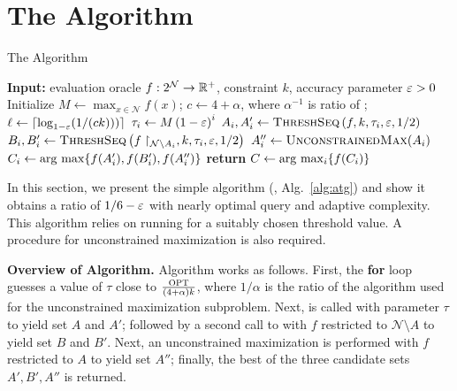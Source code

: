 \section{The \algOnefullname Algorithm} \label{sec:atg}
\begin{algorithm}[t]
    \caption{The \adapst Algorithm}
    \label{alg:atg}
    \begin{algorithmic}[1]
      \State \textbf{Input:} evaluation oracle $f:2^{\mathcal N} \to \mathbb{R}^+$, constraint $k$,
      accuracy parameter $\varepsilon > 0$
      \State Initialize $M \gets \max_{x \in \mathcal N} f(x)$; 
      $c \gets 4 + \alpha$, where $\alpha^{-1}$ is ratio of \unc;
      $\ell \gets \lceil\log_{1 - \varepsilon}(1/(ck)))\rceil$
      \label{line:forconcurrent}
      \State $\tau_i \gets M \left( 1 - \varepsilon \right)^i$
      \State $A_i,A_i' \gets \textsc{ThreshSeq} \left( f, k, \tau_i, \varepsilon, 1 / 2 \right) $
      \State $B_i,B_i' \gets \textsc{ThreshSeq} \left( f\restriction_{\mathcal N\setminus A_i}, k, \tau_i, \varepsilon, 1 / 2 \right)$
      \State $A_i'' \gets \textsc{UnconstrainedMax} (A_i)$
      \State $C_i \gets \arg\, \max \{ f(A_i'), f(B_i'), f(A_i'') \}$
      \EndFor
      \State \textbf{return} $C \gets \arg\, \max_i \{ f(C_i) \}$
      \EndProcedure
\end{algorithmic}
\end{algorithm}
In this section, we present the simple algorithm \algOnefullname 
(\atg, Alg.~\ref{alg:atg}) and show it obtains a ratio of $1/6 - \varepsilon$ 
with nearly optimal query and adaptive complexity.
This algorithm relies on running \threseq for a suitably chosen
threshold value. A procedure for
unconstrained maximization is also required.

\textbf{Overview of Algorithm.}
Algorithm \atg works as follows.
First, the \textbf{for} loop 
guesses a value of $\tau$ close to
$\frac{\textsc{OPT}}{(4 + \alpha)k}$, where 
$1/\alpha$ is the ratio of the algorithm used for the unconstrained maximization
subproblem. 
Next, \threseq is called with parameter $\tau$ to yield set $A$ and $A'$;
followed by a second call to \threseq with $f$ restricted to $\mathcal N \setminus A$
to yield set $B$ and $B'$. Next, an unconstrained
maximization is performed with $f$ restricted to $A$ to yield
set $A''$;
finally, the best of the three candidate sets $A',B',A''$ is returned.

